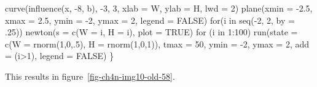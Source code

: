 \documentclass[
  a4paper,
  DIV=11,
  numbers=noendperiod,
  oneside]{scrreprt}
\newenvironment{Shaded}{}{}
\newcommand{\AttributeTok}[1]{\textcolor[rgb]{0.84,0.23,0.29}{#1}}
\newcommand{\ConstantTok}[1]{\textcolor[rgb]{0.00,0.36,0.77}{#1}}
\newcommand{\ControlFlowTok}[1]{\textcolor[rgb]{0.84,0.23,0.29}{#1}}
\newcommand{\DecValTok}[1]{\textcolor[rgb]{0.00,0.36,0.77}{#1}}
\newcommand{\FloatTok}[1]{\textcolor[rgb]{0.00,0.36,0.77}{#1}}
\newcommand{\FunctionTok}[1]{\textcolor[rgb]{0.44,0.26,0.76}{#1}}
\newcommand{\NormalTok}[1]{\textcolor[rgb]{0.14,0.16,0.18}{#1}}
\newcommand{\SpecialCharTok}[1]{\textcolor[rgb]{0.00,0.36,0.77}{#1}}
\newcommand{\StringTok}[1]{\textcolor[rgb]{0.01,0.18,0.38}{#1}}
\begin{document}
\begin{Shaded}
\begin{Highlighting}[]
  \FunctionTok{curve}\NormalTok{(}\FunctionTok{influence}\NormalTok{(x, }\SpecialCharTok{{-}}\DecValTok{8}\NormalTok{, b), }\SpecialCharTok{{-}}\DecValTok{3}\NormalTok{, }\DecValTok{3}\NormalTok{, }\AttributeTok{xlab =} \StringTok{\textquotesingle{}W\textquotesingle{}}\NormalTok{, }\AttributeTok{ylab =} \StringTok{\textquotesingle{}H\textquotesingle{}}\NormalTok{, }\AttributeTok{lwd =} \DecValTok{2}\NormalTok{)}
  \FunctionTok{plane}\NormalTok{(}\AttributeTok{xmin =} \SpecialCharTok{{-}}\FloatTok{2.5}\NormalTok{, }\AttributeTok{xmax =} \FloatTok{2.5}\NormalTok{, }\AttributeTok{ymin =} \SpecialCharTok{{-}}\DecValTok{2}\NormalTok{, }\AttributeTok{ymax =} \DecValTok{2}\NormalTok{, }\AttributeTok{legend =} \ConstantTok{FALSE}\NormalTok{)}
  \ControlFlowTok{for}\NormalTok{(i }\ControlFlowTok{in} \FunctionTok{seq}\NormalTok{(}\SpecialCharTok{{-}}\DecValTok{2}\NormalTok{, }\DecValTok{2}\NormalTok{, }\AttributeTok{by =}\NormalTok{ .}\DecValTok{25}\NormalTok{)) }\FunctionTok{newton}\NormalTok{(}\AttributeTok{s =} \FunctionTok{c}\NormalTok{(}\AttributeTok{W =}\NormalTok{ i, }\AttributeTok{H =}\NormalTok{ i), }\AttributeTok{plot =} \ConstantTok{TRUE}\NormalTok{)}
  \ControlFlowTok{for}\NormalTok{ (i }\ControlFlowTok{in} \DecValTok{1}\SpecialCharTok{:}\DecValTok{100}\NormalTok{)}
    \FunctionTok{run}\NormalTok{(}\AttributeTok{state =} \FunctionTok{c}\NormalTok{(}\AttributeTok{W =} \FunctionTok{rnorm}\NormalTok{(}\DecValTok{1}\NormalTok{,}\DecValTok{0}\NormalTok{,.}\DecValTok{5}\NormalTok{), }\AttributeTok{H =} \FunctionTok{rnorm}\NormalTok{(}\DecValTok{1}\NormalTok{,}\DecValTok{0}\NormalTok{,}\DecValTok{1}\NormalTok{)), }\AttributeTok{tmax =} \DecValTok{50}\NormalTok{, }\AttributeTok{ymin =} \SpecialCharTok{{-}}\DecValTok{2}\NormalTok{,}
        \AttributeTok{ymax =} \DecValTok{2}\NormalTok{, }\AttributeTok{add =}\NormalTok{ (i}\SpecialCharTok{\textgreater{}}\DecValTok{1}\NormalTok{), }\AttributeTok{legend =} \ConstantTok{FALSE}\NormalTok{)}
\NormalTok{\}}
\end{Highlighting}
\end{Shaded}

This results in figure~\ref{fig-ch4n-img10-old-58}.
\end{document}
